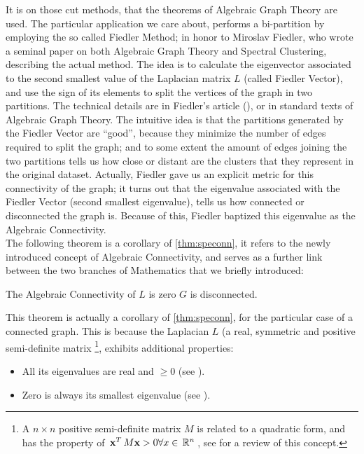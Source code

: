 It is on those cut methods, that the theorems of Algebraic
Graph Theory are used. The particular application we care about,
performs a bi-partition by employing the so called Fiedler Method; in
honor to Miroslav Fiedler, who wrote a seminal paper on both Algebraic
Graph Theory and Spectral Clustering, describing the actual
method. The idea is to calculate the eigenvector associated to the
second smallest value of the Laplacian matrix $L$ (called Fiedler
Vector), and use the sign of 
its elements to split the vertices of the graph in two
partitions. The technical details are in Fiedler's article
(\cite{fiedler73}), or in standard texts of Algebraic Graph Theory.
The intuitive idea is that the partitions generated by the Fiedler
Vector are ``good'', because they minimize the number of edges
required to split the graph; and to some extent the amount of edges
joining the two partitions tells us how close or distant are the
clusters that they represent in the original dataset. Actually,
Fiedler gave us an explicit metric for this connectivity of the graph;
it turns out that the eigenvalue associated with the Fiedler Vector
(second smallest eigenvalue), tells us how connected or disconnected
the graph is. Because of this, Fiedler baptized this eigenvalue as the
Algebraic Connectivity. \\

The following theorem is a corollary of \cref{thm:speconn}, 
it refers to the newly introduced concept of Algebraic Connectivity,
and serves as a further link between the two branches of Mathematics
that we briefly introduced: \\

\begin{theorem}
  \label{thm:algconn}
  The Algebraic Connectivity of $L$ is zero \iff $G$ is disconnected. 
\end{theorem}

This theorem is actually a corollary of \cref{thm:speconn}, for
the particular case of a connected graph. This is because the
Laplacian $L$ (a real, symmetric and positive semi-definite
matrix \footnote{A $n \times n$ positive semi-definite matrix $M$ is
  related to a 
  quadratic form, and has the property of $\,{\mathbf{x}}^{T}\,M\mathbf{x} > 0
\forall x \in \,\mathbb{R}^{n}\,$, see \cite{strange88} for a review of this concept.}, exhibits additional properties: \\ 

\begin{itemize}
  \item All its eigenvalues are real and $ \ge 0$ (see \cite{strang88}). \\
  \item Zero is always its smallest eigenvalue (see \cite{luxburg07}).
\end{itemize}
\hfill


